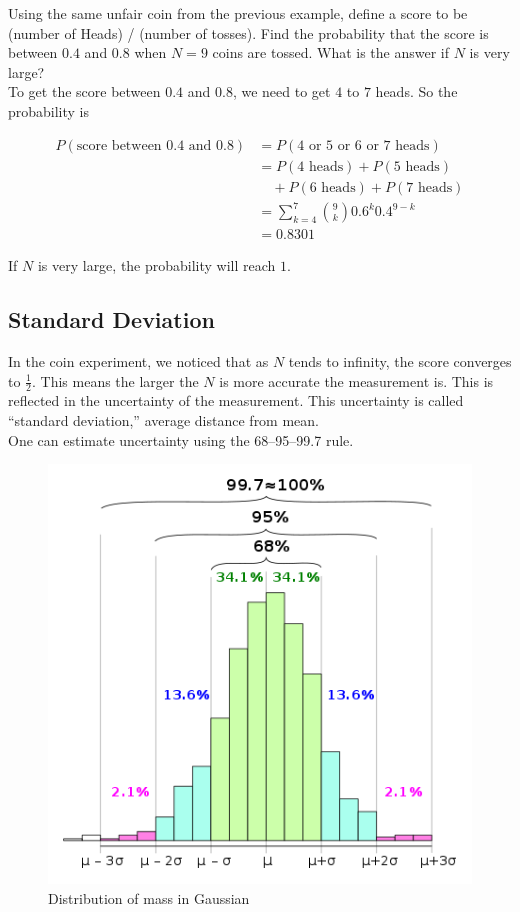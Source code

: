 \documentclass[12pt, a4paper]{article}
\newcounter{exa}
\begin{document}
\begin{texample}
Using the same unfair coin from the previous example, define a score to be (number of Heads) / (number of tosses). Find the probability that the score is between $0.4$ and $0.8$ when $N=9$ coins are tossed. What is the answer if $N$ is very large? \\

To get the score between $0.4$ and $0.8$, we need to get $4$ to $7$ heads. So the probability is

\begin{align*}
P(\text{score between 0.4 and 0.8})&=P(\text{4 or 5 or 6 or 7 heads}) \\
&= P(\text{4 heads})+P(\text{5 heads}) \\
&\quad + P(\text{6 heads})+P(\text{7 heads}) \\
&= \sum_{k=4}^7 \binom{9}{k}0.6^k0.4^{9-k} \\
&= 0.8301
\end{align*}

If $N$ is very large, the probability will reach $1$.
\end{texample}

\subsection{Standard Deviation}

In the coin experiment, we noticed that as $N$ tends to infinity, the score converges to $\frac{1}{2}$. This means the larger the $N$ is more accurate the measurement is. This is reflected in the uncertainty of the measurement. This uncertainty is called ``standard deviation,'' average distance from mean. \\

One can estimate uncertainty using the 68–95–99.7 rule.

\begin{figure}[H]
\centering
\includegraphics[width=120mm]{4.png}
\caption{Distribution of mass in Gaussian}
\end{figure}
\end{document}
